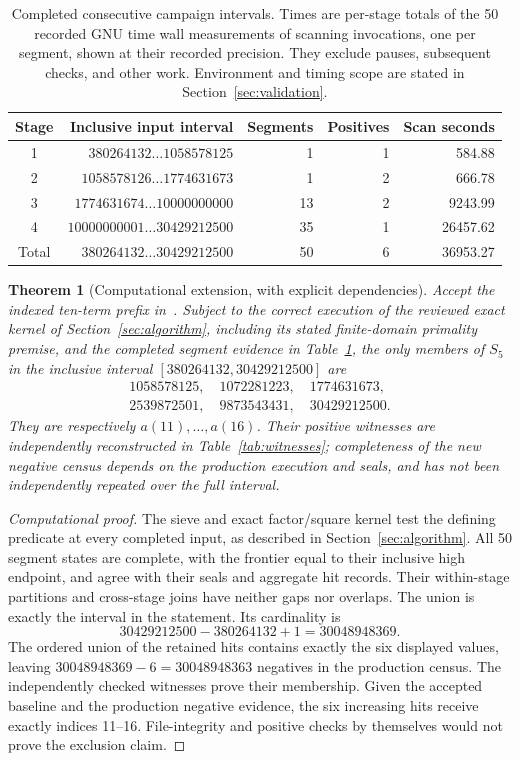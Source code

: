 \documentclass[11pt,a4paper]{article}
\newtheorem{theorem}{Theorem}[section]
\theoremstyle{definition}
\theoremstyle{remark}
\begin{document}
\begin{table}[htbp]
\centering\small
\begin{tabular}{crrrr}
\toprule
Stage & Inclusive input interval & Segments & Positives & Scan seconds\\
\midrule
1&$380264132\ldots1058578125$&1&1&584.88\\
2&$1058578126\ldots1774631673$&1&2&666.78\\
3&$1774631674\ldots10000000000$&13&2&9243.99\\
4&$10000000001\ldots30429212500$&35&1&26457.62\\
\midrule
Total&$380264132\ldots30429212500$&50&6&36953.27\\
\bottomrule
\end{tabular}
\caption{Completed consecutive campaign intervals. Times are per-stage totals
of the 50 recorded GNU time wall measurements of scanning invocations,
one per segment, shown at their recorded precision. They exclude pauses,
subsequent checks, and other work. Environment and timing scope are stated in
Section~\ref{sec:validation}.}\label{tab:campaign}
\end{table}

\begin{theorem}[Computational extension, with explicit dependencies]\label{thm:census}
Accept the indexed ten-term prefix in~\cite{sequence}. Subject to the
correct execution of the reviewed exact kernel of Section~\ref{sec:algorithm},
including its stated finite-domain primality premise, and the completed
segment evidence in Table~\ref{tab:campaign}, the only members of $S_5$
in the inclusive interval $[380264132,30429212500]$ are
\[
 \begin{gathered}
 1058578125,\quad1072281223,\quad1774631673,\\
 2539872501,\quad9873543431,\quad30429212500.
 \end{gathered}
\]
They are respectively $a(11),\ldots,a(16)$. Their positive witnesses are
independently reconstructed in Table~\ref{tab:witnesses}; completeness
of the new negative census depends on the production execution and seals,
and has not been independently repeated over the full interval.
\end{theorem}
\begin{proof}[Computational proof]
The sieve and exact factor/square kernel test the defining predicate at
every completed input, as described in Section~\ref{sec:algorithm}.
All 50 segment states are complete, with the frontier equal to their
inclusive high endpoint, and agree with their seals and aggregate hit
records. Their within-stage partitions and cross-stage joins have neither
gaps nor overlaps. The union is exactly the interval in the statement.
Its cardinality is
\[
 30429212500-380264132+1=30048948369.
\]
The ordered union of the retained hits contains exactly the six displayed
values, leaving $30048948369-6=30048948363$ negatives in the production
census. The independently checked witnesses prove their membership.
Given the accepted baseline and the production negative evidence, the
six increasing hits receive exactly indices 11--16. File-integrity and
positive checks by themselves would not prove the exclusion claim.
\end{proof}
\end{document}
